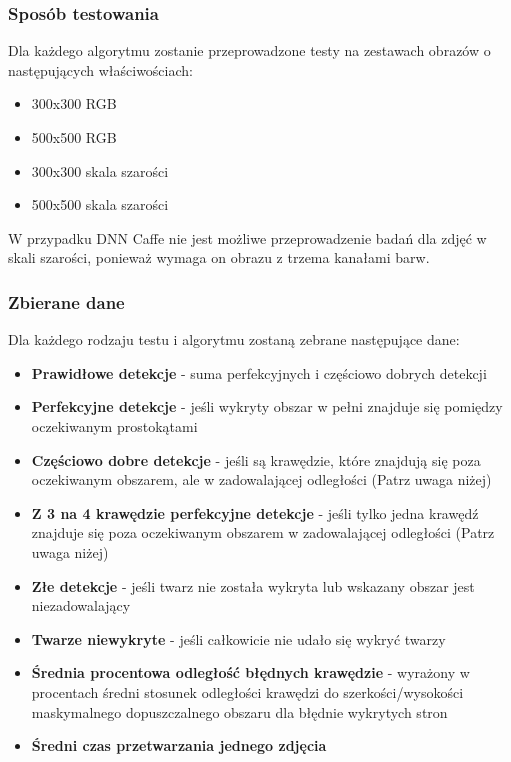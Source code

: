 \documentclass[10pt, a4paper]{article}
\begin{document}
\subsubsection{Sposób testowania}

Dla każdego algorytmu zostanie przeprowadzone testy na zestawach obrazów o następujących właściwościach:

\begin{itemize}
    \item 300x300 RGB
    \item 500x500 RGB
    \item 300x300 skala szarości
    \item 500x500 skala szarości
\end{itemize}

W przypadku DNN Caffe nie jest możliwe przeprowadzenie badań dla zdjęć w skali szarości, ponieważ wymaga on obrazu z trzema kanałami barw.

\subsubsection{Zbierane dane}

Dla każdego rodzaju testu i algorytmu zostaną zebrane następujące dane:

\begin{itemize}
    \item \textbf{Prawidłowe detekcje} - suma perfekcyjnych i częściowo dobrych detekcji
    \item \textbf{Perfekcyjne detekcje} - jeśli wykryty obszar w pełni znajduje się pomiędzy oczekiwanym prostokątami
    \item \textbf{Częściowo dobre detekcje} - jeśli są krawędzie, które znajdują się poza oczekiwanym obszarem, ale w zadowalającej odległości (Patrz uwaga niżej)
    \item \textbf{Z 3 na 4 krawędzie perfekcyjne detekcje} - jeśli tylko jedna krawędź znajduje się poza oczekiwanym obszarem w zadowalającej odległości (Patrz uwaga niżej)
    \item \textbf{Złe detekcje} - jeśli twarz nie została wykryta lub wskazany obszar jest niezadowalający
    \item \textbf{Twarze niewykryte} - jeśli całkowicie nie udało się wykryć twarzy
    \item \textbf{Średnia procentowa odległość błędnych krawędzie} - wyrażony w procentach średni stosunek odległości krawędzi do szerkości/wysokości maskymalnego dopuszczalnego obszaru dla błędnie wykrytych stron
    \item \textbf{Średni czas przetwarzania jednego zdjęcia}
\end{itemize}
\end{document}
